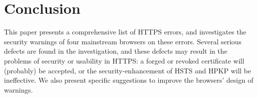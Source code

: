 \section{Conclusion}
This paper presents a comprehensive list of HTTPS errors,
 and investigates the security warnings of four mainstream browsers on these errors.
Several  serious defects are found in the investigation,
 and these defects may result in the problems of security or usability in HTTPS:
a forged or revoked certificate will (probably) be accepted,
    or the security-enhancement of HSTS and HPKP will be ineffective.
We also present specific suggestions to improve the browsers' design of warnings.

